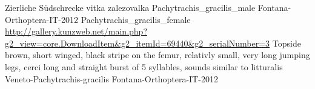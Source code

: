 {Zierliche S\"udschrecke} %
{vitka zalezovalka} %
{} %
{Pachytrachis_gracilis_male} %
{Fontana-Orthoptera-IT-2012}%
{Pachytrachis_gracilis_female} %
{\url{http://gallery.kunzweb.net/main.php?g2_view=core.DownloadItem&g2_itemId=69440&g2_serialNumber=3}} %
{Topside brown, short winged, black stripe on the femur, relativly small, very long jumping legs, cerci long and straight} %
{burst of 5 syllables, sounds similar to litturalis} %
{Veneto-Pachytrachis-gracilis} %
{Fontana-Orthoptera-IT-2012}%
